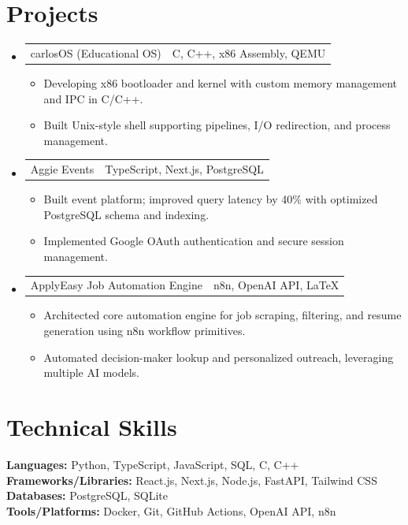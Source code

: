 \documentclass[letterpaper,11pt]{article}
\makeatletter
\newcommand{\resumeItem}[1]{
  \item\small{{#1 \vspace{-2pt}}}
}
\newcommand{\resumeProjectHeading}[2]{
    \item
    \begin{tabular*}{0.97\textwidth}{l@{\extracolsep{\fill}}r}
      \small#1 & #2 \\
    \end{tabular*}\vspace{-7pt}
}
\newcommand{\resumeSubHeadingListStart}{\begin{itemize}[leftmargin=0.15in, label={}]}
\newcommand{\resumeSubHeadingListEnd}{\end{itemize}}
\newcommand{\resumeItemListStart}{\begin{itemize}}
\newcommand{\resumeItemListEnd}{\end{itemize}\vspace{-5pt}}
\makeatother
\begin{document}
\section{Projects}
\resumeSubHeadingListStart
\resumeProjectHeading
{carlosOS (Educational OS)}{C, C++, x86 Assembly, QEMU}
\resumeItemListStart
\resumeItem{Developing x86 bootloader and kernel with custom memory management and IPC in C/C++.}
\resumeItem{Built Unix-style shell supporting pipelines, I/O redirection, and process management.}
\resumeItemListEnd

\resumeProjectHeading
{Aggie Events}{TypeScript, Next.js, PostgreSQL}
\resumeItemListStart
\resumeItem{Built event platform; improved query latency by 40\% with optimized PostgreSQL schema and indexing.}
\resumeItem{Implemented Google OAuth authentication and secure session management.}
\resumeItemListEnd

\resumeProjectHeading
{ApplyEasy Job Automation Engine}{n8n, OpenAI API, LaTeX}
\resumeItemListStart
\resumeItem{Architected core automation engine for job scraping, filtering, and resume generation using n8n workflow primitives.}
\resumeItem{Automated decision-maker lookup and personalized outreach, leveraging multiple AI models.}
\resumeItemListEnd
\resumeSubHeadingListEnd

\section{Technical Skills}
\begin{itemize}[leftmargin=0.15in, label={}]
  \small{\item{
    \textbf{Languages:} Python, TypeScript, JavaScript, SQL, C, C++ \\
    \textbf{Frameworks/Libraries:} React.js, Next.js, Node.js, FastAPI, Tailwind CSS \\
    \textbf{Databases:} PostgreSQL, SQLite \\
    \textbf{Tools/Platforms:} Docker, Git, GitHub Actions, OpenAI API, n8n
  }}
\end{itemize}
\end{document}
